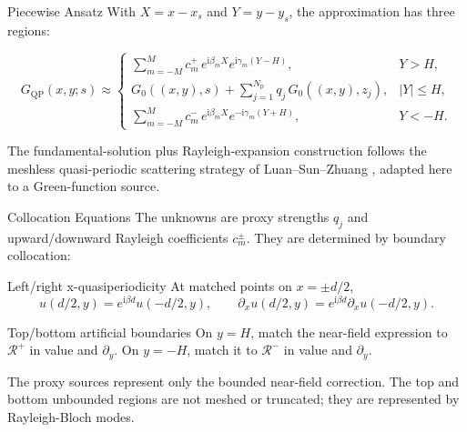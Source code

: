 \documentclass[aspectratio=169]{beamer}
\newcommand{\ii}{\mathrm{i}}
\newcommand{\Gqp}{G_{\mathrm{QP}}}
\newcommand{\Gfree}{G_0}
\newcommand{\Np}{N_{\mathrm p}}
\newcommand{\Rup}{\mathcal R^+}
\newcommand{\Rdn}{\mathcal R^-}
\begin{document}
\begin{frame}{Piecewise Ansatz}
  \footnotesize
  With \(X=x-x_s\) and \(Y=y-y_s\), the approximation has three regions:

  \[
  \Gqp(x,y;s)\approx
  \begin{cases}
  \displaystyle
  \sum_{m=-M}^{M} c_m^+\,
  e^{\ii\beta_m X}e^{\ii\gamma_m(Y-H)},
  & Y>H,\\[0.45em]
  \displaystyle
  \Gfree((x,y),s)+
  \sum_{j=1}^{\Np} q_j\,\Gfree((x,y),z_j),
  & |Y|\le H,\\[0.45em]
  \displaystyle
  \sum_{m=-M}^{M} c_m^-\,
  e^{\ii\beta_m X}e^{-\ii\gamma_m(Y+H)},
  & Y<-H.
  \end{cases}
  \]

  \vspace{0.3em}
  The fundamental-solution plus Rayleigh-expansion construction follows the
  meshless quasi-periodic scattering strategy of Luan--Sun--Zhuang
  \cite{LuanSunZhuang2019}, adapted here to a Green-function source.
\end{frame}

\begin{frame}{Collocation Equations}
  \small
  The unknowns are proxy strengths \(q_j\) and upward/downward Rayleigh
  coefficients \(c_m^\pm\).  They are determined by boundary collocation:

  \begin{block}{Left/right x-quasiperiodicity}
    At matched points on \(x=\pm d/2\),
    \[
      u(d/2,y)=e^{\ii\beta d}u(-d/2,y),
      \qquad
      \partial_x u(d/2,y)=e^{\ii\beta d}\partial_x u(-d/2,y).
    \]
  \end{block}

  \begin{block}{Top/bottom artificial boundaries}
    On \(y=H\), match the near-field expression to \(\Rup\) in value and
    \(\partial_y\).  On \(y=-H\), match it to \(\Rdn\) in value and
    \(\partial_y\).
  \end{block}

  \vspace{0.2em}
  The proxy sources represent only the bounded near-field correction.  The
  top and bottom unbounded regions are not meshed or truncated; they are
  represented by Rayleigh-Bloch modes.
\end{frame}
\end{document}

